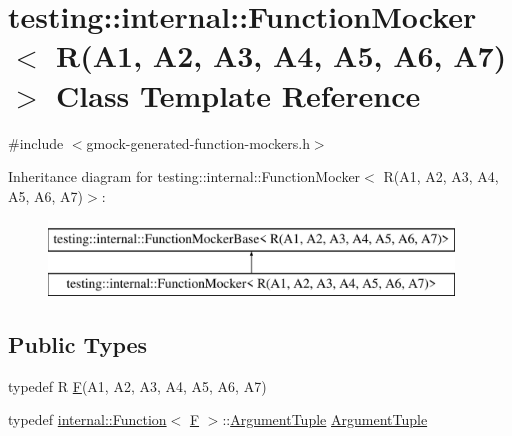 \hypertarget{classtesting_1_1internal_1_1FunctionMocker_3_01R_07A1_00_01A2_00_01A3_00_01A4_00_01A5_00_01A6_00_01A7_08_4}{}\section{testing\+::internal\+::Function\+Mocker$<$ R(A1, A2, A3, A4, A5, A6, A7)$>$ Class Template Reference}
\label{classtesting_1_1internal_1_1FunctionMocker_3_01R_07A1_00_01A2_00_01A3_00_01A4_00_01A5_00_01A6_00_01A7_08_4}


{\ttfamily \#include $<$gmock-\/generated-\/function-\/mockers.\+h$>$}

Inheritance diagram for testing\+::internal\+::Function\+Mocker$<$ R(A1, A2, A3, A4, A5, A6, A7)$>$\+:\begin{figure}[H]
\begin{center}
\leavevmode
\includegraphics[height=2.000000cm]{classtesting_1_1internal_1_1FunctionMocker_3_01R_07A1_00_01A2_00_01A3_00_01A4_00_01A5_00_01A6_00_01A7_08_4}
\end{center}
\end{figure}
\subsection*{Public Types}
\begin{DoxyCompactItemize}
\item 
typedef R \mbox{\hyperlink{classtesting_1_1internal_1_1FunctionMocker_3_01R_07A1_00_01A2_00_01A3_00_01A4_00_01A5_00_01A6_00_01A7_08_4_a2ea0e33d9cc0d1f57d58b4aee98c117c}{F}}(A1, A2, A3, A4, A5, A6, A7)
\item 
typedef \mbox{\hyperlink{structtesting_1_1internal_1_1Function}{internal\+::\+Function}}$<$ \mbox{\hyperlink{classtesting_1_1internal_1_1FunctionMocker_3_01R_07A1_00_01A2_00_01A3_00_01A4_00_01A5_00_01A6_00_01A7_08_4_a2ea0e33d9cc0d1f57d58b4aee98c117c}{F}} $>$\+::\mbox{\hyperlink{classtesting_1_1internal_1_1FunctionMocker_3_01R_07A1_00_01A2_00_01A3_00_01A4_00_01A5_00_01A6_00_01A7_08_4_a313911b9c80b57c8c25f0ad5ef2d0bdc}{Argument\+Tuple}} \mbox{\hyperlink{classtesting_1_1internal_1_1FunctionMocker_3_01R_07A1_00_01A2_00_01A3_00_01A4_00_01A5_00_01A6_00_01A7_08_4_a313911b9c80b57c8c25f0ad5ef2d0bdc}{Argument\+Tuple}}
\end{DoxyCompactItemize}
